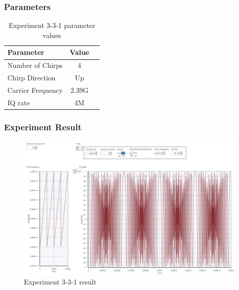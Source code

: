     \subsubsection*{Parameters}
    \begin{table}[!h]\centering
        \hspace{10mm}
        \begin{tabular}{|l|c|c|}
        \hline
        \multicolumn{1}{|l|}{Parameter} & \multicolumn{1}{l|}{Value} \\
        \hline
        Number of Chirps & 4 \\ 
        \hline
        Chirp Direction & Up \\ 
        \hline
        Carrier Frequency & 2.39G \\ 
        \hline
        IQ rate & 4M \\ 
        \hline
        \end{tabular}
        \caption{Experiment 3-3-1 parameter values}
    \end{table}
    
    \subsubsection*{Experiment Result}
    \vspace{-4mm}  
    \begin{figure}[!h]\raggedleft
    \hspace{15mm}
		\includegraphics[width=.95\textwidth]{image/week03/3-3-1.png}
		\caption{\footnotesize Experiment 3-3-1 result}
		\vspace{-10pt}
    \end{figure}
    
\clearpage
    

